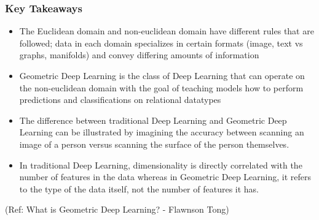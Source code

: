 \begin{frame}[fragile]\frametitle{Key Takeaways}


\begin{itemize}
\item  The Euclidean domain and non-euclidean domain have different rules that are followed; data in each domain specializes in certain formats (image, text vs graphs, manifolds) and convey differing amounts of information
\item  Geometric Deep Learning is the class of Deep Learning that can operate on the non-euclidean domain with the goal of teaching models how to perform predictions and classifications on relational datatypes
\item  The difference between traditional Deep Learning and Geometric Deep Learning can be illustrated by imagining the accuracy between scanning an image of a person versus scanning the surface of the person themselves.
\item  In traditional Deep Learning, dimensionality is directly correlated with the number of features in the data whereas in Geometric Deep Learning, it refers to the type of the data itself, not the number of features it has.
\end{itemize}
	  
{\tiny (Ref: What is Geometric Deep Learning? - Flawnson Tong)}

\end{frame}


